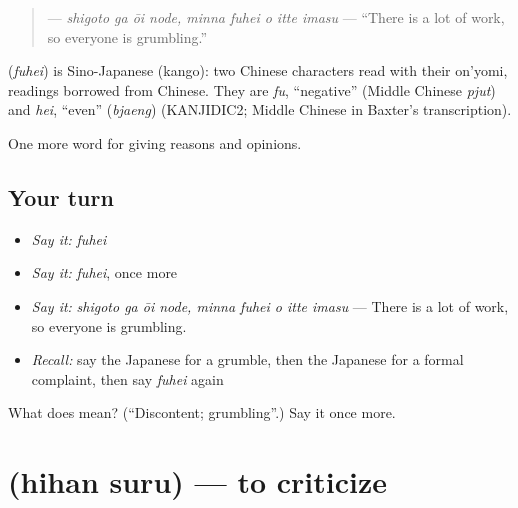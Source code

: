 \begin{quote}
\textbf{   } — \emph{shigoto ga ōi node, minna fuhei o itte imasu} — \textquotedblleft{}There is a lot of work, so everyone is grumbling.\textquotedblright{}
\end{quote}

\begin{cousinweb}
\textbf{} (\emph{fuhei}) is Sino-Japanese (kango): two Chinese characters read with their on'yomi, readings borrowed from Chinese. They are \emph{fu}, \textquotedblleft{}negative\textquotedblright{} (Middle Chinese \emph{pjut}) and \emph{hei}, \textquotedblleft{}even\textquotedblright{} (\emph{bjaeng}) (KANJIDIC2; Middle Chinese in Baxter's transcription).
\end{cousinweb}

\begin{grammarlens}[title={What you've built}]
One more word for giving reasons and opinions.
\end{grammarlens}

\subsection*{Your turn}
\begin{itemize}
\raggedright
  \item \emph{Say it:} \emph{fuhei}
  \item \emph{Say it:} \emph{fuhei}, once more
  \item \emph{Say it:} \emph{shigoto ga ōi node, minna fuhei o itte imasu} — There is a lot of work, so everyone is grumbling.
  \item \emph{Recall:} say the Japanese for a grumble, then the Japanese for a formal complaint, then say \emph{fuhei} again
\end{itemize}

\begin{tcolorbox}[breakable,colback=teal!4,colframe=teal!35!black,title={Before you move on}]
What does  mean? (\textquotedblleft{}Discontent; grumbling\textquotedblright{}.) Say it once more.
\end{tcolorbox}
\section[\texorpdfstring{\ja{ひはんする} (hihan suru)}{ひはんする (hihan suru)}]{ (hihan suru) — to criticize}

